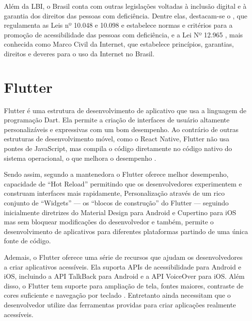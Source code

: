 Além da LBI, o Brasil conta com outras legislações voltadas à inclusão digital e à garantia dos direitos das pessoas com deficiência. Dentre elas, destacam-se o \cite{decreto5296}, que regulamenta as Leis nº 10.048 e 10.098 e estabelece normas e critérios para a promoção de acessibilidade das pessoas com deficiência, e a Lei Nº 12.965 \cite{lei12965}, mais conhecida como Marco Civil da Internet, que estabelece princípios, garantias, direitos e deveres para o uso da Internet no Brasil.

\section{Flutter}

Flutter é uma estrutura de desenvolvimento de aplicativo que usa a linguagem de programação Dart. Ela permite a criação de interfaces de usuário altamente personalizáveis e expressivas com um bom desempenho. Ao contrário de outras estruturas de desenvolvimento móvel, como o React Native, Flutter não usa pontes de JavaScript, mas compila o código diretamente no código nativo do sistema operacional, o que melhora o desempenho \cite{flutter}.

Sendo assim, segundo a mantenedora o Flutter oferece melhor desempenho, capacidade de “Hot Reload” permitindo que os desenvolvedores experimentem e construam interfaces mais rapidamente, Personalização através de um rico conjunto de “Widgets” --- os “blocos de construção” do Flutter --- seguindo inicialmente diretrizes do Material Design para Android e Cupertino para iOS mas sem bloquear modificações do desenvolvedor e também, permite o desenvolvimento de aplicativos para diferentes plataformas partindo de uma única fonte de código.

Ademais, o Flutter oferece uma série de recursos que ajudam os desenvolvedores a criar aplicativos acessíveis. Ela suporta APIs de acessibilidade para Android e iOS, incluindo a API TalkBack para Android e a API VoiceOver para iOS. Além disso, o Flutter tem suporte para ampliação de tela, fontes maiores, contraste de cores suficiente e navegação por teclado \cite{flutter}. Entretanto ainda necessitam que o desenvolvedor utilize das ferramentas providas para criar aplicações realmente acessíveis.